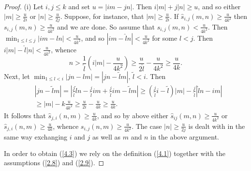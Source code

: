 \begin{proof} (i) Let $i,j\leq k$ and set $u=|im-jn|$. Then $i|m|+j|n|\geq u$,
and so either $|m|\geq\frac u{2i}$ or $|n|\geq\frac u{2j}$. Suppose, for 
instance, that $|m|\geq\frac u{2i}$. If $\hat s_{i,j}(m,n)\geq\frac u{4k^2}$
then $s_{i,j}(m,n)\geq\frac u{4k^2}$ and we are done. So assume that 
$s_{i,j}(m,n)<\frac u{4k^2}$. Then $\min_{1\leq l\leq j}|im-ln|<\frac
u{4k^2}$, and so $|im-\hat ln|<\frac u{4k^2}$ for some $\hat l<j$. Then
$i|m|-\hat l|n|<\frac u{4k^2}$, whence 
\[
n>\frac 1{\hat l}(i|m|-\frac u{4k^2})\geq\frac u{2\hat l}-\frac u{4k^2}\geq
\frac u{4k}.
\]
Next, let $\min_{1\leq l<i}|jn-lm|=|jn-\tilde lm|,\,\tilde l<i$. Then
\begin{eqnarray*}
&|jn-\tilde lm|=|\frac j{\hat l}\hat ln-\frac j{\hat l}im+\frac j{\hat l}im-
\tilde lm|\geq(\frac j{\hat l}i-\tilde l)|m|-\frac j{\hat l}|\hat ln-im|\\
&\geq |m|-k\frac u{4k^2}\geq\frac u{2i}-\frac u{4k}\geq\frac u{4k}.
\end{eqnarray*}
It follows that $\hat s_{j,i}(n,m)\geq\frac u{4k}$, and so by above either
$\hat s_{ij}(m,n)\geq\frac u{4k^2}$ or $\hat s_{j,i}(n,m)\geq\frac u{4k}$, 
whence
$s_{i,j}(n,m)\geq\frac u{4k^2}$. The case $|n|\geq\frac u{2j}$ is dealt with
in the same way exchanging $i$ and $j$ as well as $m$ and $n$ in the above
argument.

In order to obtain (\ref{4.3}) we rely on the definition (\ref {4.1}) together
 with the assumptions (\ref{2.8}) and (\ref{2.9}).
 

\end{proof}

